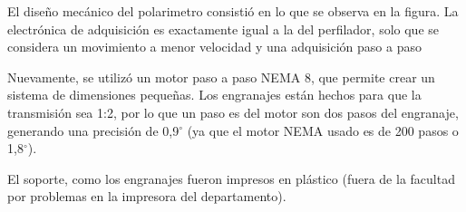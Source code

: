 El diseño mecánico del polarimetro consistió en lo que se observa en la figura. La electrónica de adquisición es exactamente igual a la del perfilador, solo que se considera un movimiento a menor velocidad y una adquisición paso a paso

Nuevamente, se utilizó un motor paso a paso NEMA 8, que permite crear un sistema de dimensiones pequeñas. Los engranajes están hechos para que la transmisión sea 1:2, por lo que un paso es del motor son dos pasos del engranaje, generando una precisión de 0,9$^\circ$ (ya que el motor NEMA usado es de 200 pasos o 1,8$^\circ$). 

El soporte, como los engranajes fueron impresos en plástico (fuera de la facultad por problemas en la impresora del departamento).
